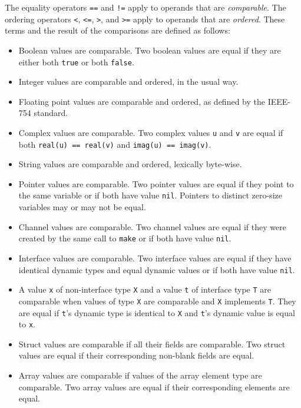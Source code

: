 The equality operators \texttt{==} and \texttt{!=} apply to operands
that are \emph{comparable}. The ordering operators \texttt{\textless{}},
\texttt{\textless{}=}, \texttt{\textgreater{}}, and
\texttt{\textgreater{}=} apply to operands that are \emph{ordered}.
These terms and the result of the comparisons are defined as follows:

\begin{itemize}
\item
  Boolean values are comparable. Two boolean values are equal if they
  are either both \texttt{true} or both \texttt{false}.
\item
  Integer values are comparable and ordered, in the usual way.
\item
  Floating point values are comparable and ordered, as defined by the
  IEEE-754 standard.
\item
  Complex values are comparable. Two complex values \texttt{u} and
  \texttt{v} are equal if both \texttt{real(u) == real(v)} and
  \texttt{imag(u) == imag(v)}.
\item
  String values are comparable and ordered, lexically byte-wise.
\item
  Pointer values are comparable. Two pointer values are equal if they
  point to the same variable or if both have value \texttt{nil}.
  Pointers to distinct
  zero-size variables may
  or may not be equal.
\item
  Channel values are comparable. Two channel values are equal if they
  were created by the same call to \texttt{make}
  or if both have value \texttt{nil}.
\item
  Interface values are comparable. Two interface values are equal if
  they have identical dynamic types and equal
  dynamic values or if both have value \texttt{nil}.
\item
  A value \texttt{x} of non-interface type \texttt{X} and a value
  \texttt{t} of interface type \texttt{T} are comparable when values of
  type \texttt{X} are comparable and \texttt{X} implements \texttt{T}.
  They are equal if \texttt{t}'s dynamic type is identical to \texttt{X}
  and \texttt{t}'s dynamic value is equal to \texttt{x}.
\item
  Struct values are comparable if all their fields are comparable. Two
  struct values are equal if their corresponding
  non-blank fields are equal.
\item
  Array values are comparable if values of the array element type are
  comparable. Two array values are equal if their corresponding elements
  are equal.
\end{itemize}

